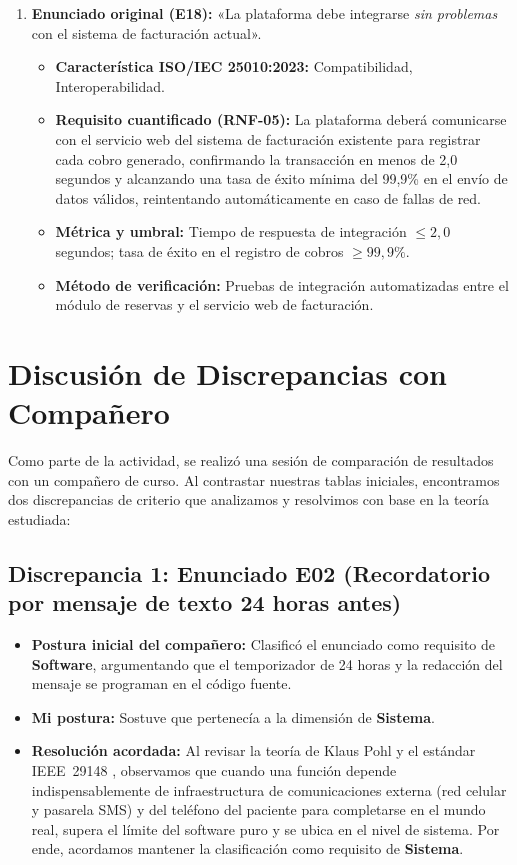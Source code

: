 \documentclass[11pt,a4paper]{article}
\begin{document}
\begin{enumerate}
    \item \textbf{Enunciado original (E18):} «La plataforma debe integrarse \textit{sin problemas} con el sistema de facturación actual».
    \begin{itemize}
        \item \textbf{Característica ISO/IEC 25010:2023:} Compatibilidad, Interoperabilidad.
        \item \textbf{Requisito cuantificado (RNF-05):} La plataforma deberá comunicarse con el servicio web del sistema de facturación existente para registrar cada cobro generado, confirmando la transacción en menos de 2,0 segundos y alcanzando una tasa de éxito mínima del 99,9\% en el envío de datos válidos, reintentando automáticamente en caso de fallas de red.
        \item \textbf{Métrica y umbral:} Tiempo de respuesta de integración $\le 2,0$ segundos; tasa de éxito en el registro de cobros $\ge 99,9\%$.
        \item \textbf{Método de verificación:} Pruebas de integración automatizadas entre el módulo de reservas y el servicio web de facturación.
    \end{itemize}
\end{enumerate}

\section{Discusión de Discrepancias con Compañero}

Como parte de la actividad, se realizó una sesión de comparación de resultados con un compañero de curso. Al contrastar nuestras tablas iniciales, encontramos dos discrepancias de criterio que analizamos y resolvimos con base en la teoría estudiada:

\subsection*{Discrepancia 1: Enunciado E02 (Recordatorio por mensaje de texto 24 horas antes)}
\begin{itemize}
    \item \textbf{Postura inicial del compañero:} Clasificó el enunciado como requisito de \textbf{Software}, argumentando que el temporizador de 24 horas y la redacción del mensaje se programan en el código fuente.
    \item \textbf{Mi postura:} Sostuve que pertenecía a la dimensión de \textbf{Sistema}.
    \item \textbf{Resolución acordada:} Al revisar la teoría de Klaus Pohl \cite{pohl2025} y el estándar IEEE~29148 \cite{iso29148}, observamos que cuando una función depende indispensablemente de infraestructura de comunicaciones externa (red celular y pasarela SMS) y del teléfono del paciente para completarse en el mundo real, supera el límite del software puro y se ubica en el nivel de sistema. Por ende, acordamos mantener la clasificación como requisito de \textbf{Sistema}.
\end{itemize}
\end{document}
